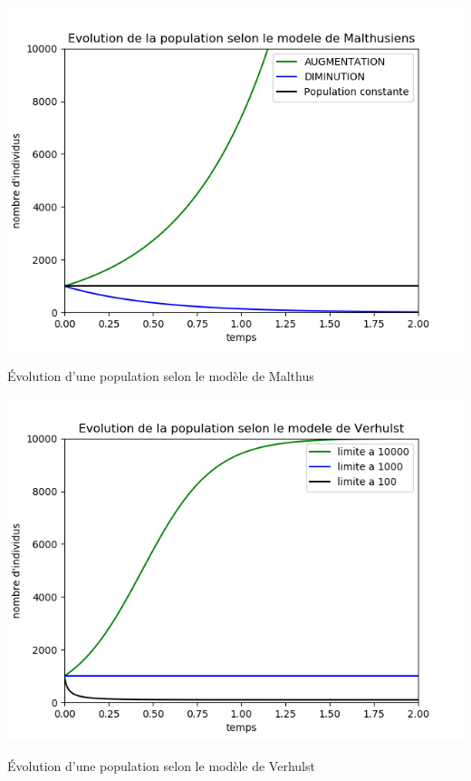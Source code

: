 \begin{minipage}[c]{.46\linewidth}
    \centering
    \includegraphics[scale=0.5]{images/Malthus.png}
    \captionsetup{type=figure}\caption{Évolution d'une population selon le modèle de Malthus}
    \label{fig:Malthus}
\end{minipage}
\hfill
\begin{minipage}[c]{.46\linewidth}
    \centering
    \includegraphics[scale=0.5]{images/Verhulst.png}
    \captionsetup{type=figure}\caption{Évolution d'une population selon le modèle de Verhulst}
    \label{fig:Verhulst}
\end{minipage}
\vspace{4.00mm}

